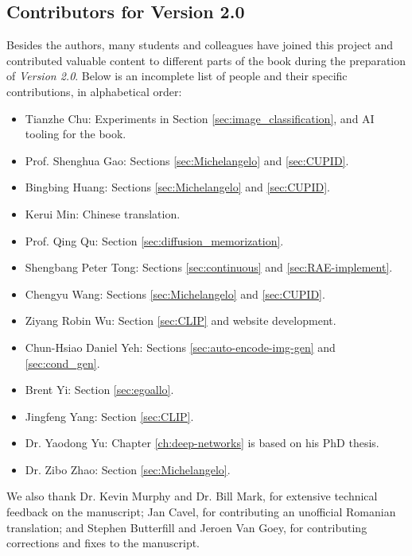 \documentclass[../../book-main.tex]{subfiles}
\begin{document}
\subsection*{Contributors for Version 2.0}
Besides the authors, many students and colleagues have joined this project and contributed valuable content to different parts of the book during the preparation of {\em Version 2.0}. Below is an incomplete list of people and their specific contributions, in alphabetical order:
\begin{itemize}
    \item Tianzhe Chu: Experiments in Section \ref{sec:image_classification}, and AI tooling for the book.
    \item Prof. Shenghua Gao: Sections \ref{sec:Michelangelo} and \ref{sec:CUPID}.
    \item Bingbing Huang: Sections \ref{sec:Michelangelo} and \ref{sec:CUPID}.
    \item Kerui Min: Chinese translation.
    \item Prof. Qing Qu: Section \ref{sec:diffusion_memorization}.
    \item Shengbang Peter Tong: Sections \ref{sec:continuous} and \ref{sec:RAE-implement}.
    \item Chengyu Wang: Sections \ref{sec:Michelangelo} and \ref{sec:CUPID}.
    \item Ziyang Robin Wu: Section \ref{sec:CLIP} and website development.
    \item Chun-Hsiao Daniel Yeh: Sections \ref{sec:auto-encode-img-gen} and \ref{sec:cond_gen}.
    \item Brent Yi: Section \ref{sec:egoallo}.
    \item Jingfeng Yang: Section \ref{sec:CLIP}.
    \item Dr. Yaodong Yu: Chapter \ref{ch:deep-networks} is based on his PhD thesis.
    \item Dr. Zibo Zhao: Section \ref{sec:Michelangelo}.
\end{itemize}
We also thank Dr. Kevin Murphy and Dr. Bill Mark, for extensive technical feedback on the
manuscript; Jan Cavel, for contributing an unofficial Romanian translation;
and Stephen Butterfill and Jeroen Van Goey, for contributing corrections and fixes to the manuscript.
\end{document}
